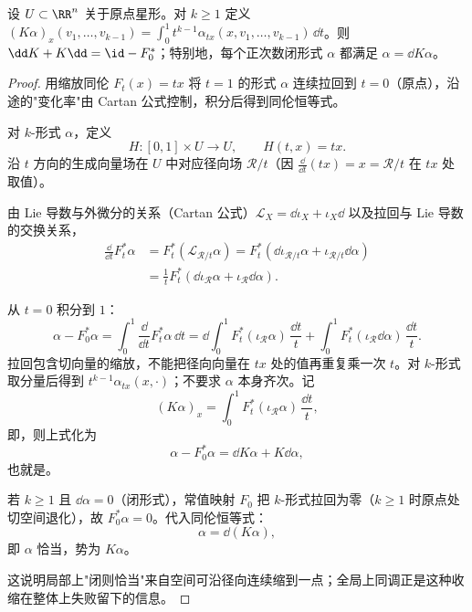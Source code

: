 \begin{lemma}
设 $U\subset\RR^n$ 关于原点星形。对 $k\ge1$ 定义 $(K\alpha)_x(v_1,\ldots,v_{k-1})=\int_0^1t^{k-1}\alpha_{tx}(x,v_1,\ldots,v_{k-1})\,\dd t$。则 $\dd K+K\dd=\id-F_0^*$；特别地，每个正次数闭形式 $\alpha$ 都满足 $\alpha=\dd K\alpha$。
\end{lemma}
\begin{proof}
用缩放同伦 $F_t(x)=tx$ 将 $t=1$ 的形式 $\alpha$ 连续拉回到 $t=0$（原点），沿途的"变化率"由 Cartan 公式控制，积分后得到同伦恒等式。

对 $k$-形式 $\alpha$，定义
\begin{equation*}
 H:[0,1]\times U\to U,
 \qquad H(t,x)=tx.
\end{equation*}
沿 $t$ 方向的生成向量场在 $U$ 中对应径向场 $\mathcal R/t$（因 $\frac{\dd}{\dd t}(tx)=x=\mathcal R/t$ 在 $tx$ 处取值）。

由 Lie 导数与外微分的关系（Cartan 公式）$\mathcal L_X=\dd\iota_X+\iota_X\dd$ 以及拉回与 Lie 导数的交换关系，
\begin{align*}
 \frac{\dd}{\dd t}F_t^*\alpha
 &=F_t^*(\mathcal L_{\mathcal R/t}\alpha)
 =F_t^*\left(\dd\iota_{\mathcal R/t}\alpha+\iota_{\mathcal R/t}\dd\alpha\right)\\
 &=\frac{1}{t}F_t^*\left(\dd\iota_{\mathcal R}\alpha+\iota_{\mathcal R}\dd\alpha\right).
\end{align*}

从 $t=0$ 积分到 $1$：
\begin{equation*}
 \alpha-F_0^*\alpha
 =\int_0^1\frac{\dd}{\dd t}F_t^*\alpha\,\dd t
 =\dd\!\int_0^1 F_t^*(\iota_{\mathcal R}\alpha)\,\frac{\dd t}{t}
 +\int_0^1 F_t^*(\iota_{\mathcal R}\dd\alpha)\,\frac{\dd t}{t}.
\end{equation*}
拉回包含切向量的缩放，不能把径向向量在 $tx$ 处的值再重复乘一次 $t$。对 $k$-形式取分量后得到 $t^{k-1}\alpha_{tx}(x,\cdot)$；不要求 $\alpha$ 本身齐次。记
\begin{equation*}
 (K\alpha)_x=\int_0^1 F_t^*(\iota_{\mathcal R}\alpha)\,\frac{\dd t}{t},
\end{equation*}
即，则上式化为
\begin{equation*}
 \alpha-F_0^*\alpha=\dd K\alpha+K\dd\alpha,
 \end{equation*}
也就是。

若 $k\ge1$ 且 $\dd\alpha=0$（闭形式），常值映射 $F_0$ 把 $k$-形式拉回为零（$k\ge1$ 时原点处切空间退化），故 $F_0^*\alpha=0$。代入同伦恒等式：
\begin{equation*}
 \alpha=\dd(K\alpha),
\end{equation*}
即 $\alpha$ 恰当，势为 $K\alpha$。

这说明局部上"闭则恰当"来自空间可沿径向连续缩到一点；全局上同调正是这种收缩在整体上失败留下的信息。
\end{proof}

